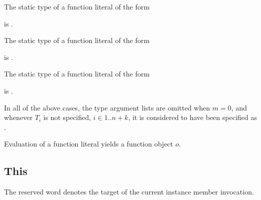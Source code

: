 \documentclass[makeidx]{article}
\begin{document}
{\LMHash{}%
The static type of a function literal of the form

\noindent
\code{<\TypeParametersStd>}

\noindent
{}

\noindent
is
.
\EndCase

\LMHash{}%
The static type of a function literal of the form

\noindent
\code{<\TypeParametersStd>}

\noindent
{}

\noindent
is
.
\EndCase

\LMHash{}%
The static type of a function literal of the form

\noindent
\code{<\TypeParametersStd>}

\noindent
{}

\noindent
is
.
\EndCase

\LMHash{}%
In all of the above cases,
the type argument lists are omitted when $m=0$,
and whenever $T_i$ is not specified, $i \in 1 .. n+k$,
it is considered to have been specified as \DYNAMIC{}.

\LMHash{}%
Evaluation of a function literal yields a function object $o$.



\subsection{This}

\LMHash{}%
The reserved word \THIS{} denotes the target of the current instance member invocation.

}
\end{document}
